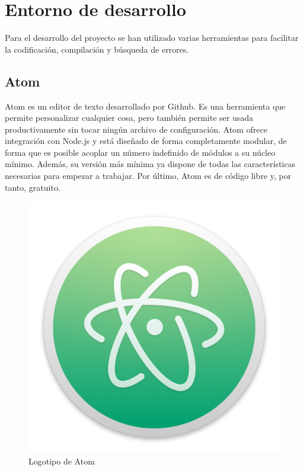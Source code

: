 \section{Entorno de desarrollo}

	Para el desarrollo del proyecto se han utilizado varias herramientas para facilitar la codificación, compilación y búsqueda de errores.

	\subsection{Atom}

		Atom es un editor de texto desarrollado por Github. Es una herramienta que permite personalizar cualquier cosa, pero también permite ser usada productivamente sin tocar ningún archivo de configuración. Atom ofrece integración con Node.js y está diseñado de forma completamente modular, de forma que es posible acoplar un número indefinido de módulos a su núcleo mínimo. Además, su versión más mínima ya dispone de todas las características necesarias para empezar a trabajar. Por último, Atom es de código libre y, por tanto, gratuito.

		\begin{figure}[!htp]
			 \centering
			 \includegraphics[scale=.15]{fig/atom}
			 \caption{Logotipo de Atom}
			 \label{fig:atom}
		\end{figure}

